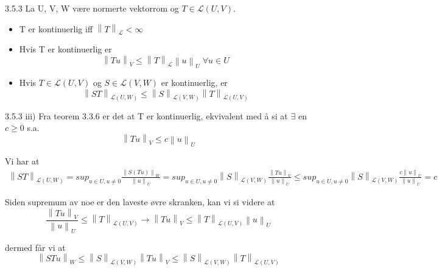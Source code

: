\documentclass[a4paper,norsk]{article}
\renewcommand{\geq}{\geqslant}
\renewcommand{\leq}{\leqslant}
\begin{document}
\begin{propositionbox}{3.5.3}{}
La U, V, W være normerte vektorrom og $ T \in \mathcal{L} \left( U, V \right)  $.
\begin{itemize}
    \item T er kontinuerlig iff $ \left\lVert T \right\rVert _{\mathcal{L} } < \infty $
    \item Hvis T er kontinuerlig er
    \[
        \left\lVert Tu \right\rVert _V \leq \left\lVert T \right\rVert _{\mathcal{L}} \left\lVert u \right\rVert _U \; \forall u \in U
    \]
    \item Hvis $ T \in \mathcal{L} \left( U, V \right)   $ og $ S \in \mathcal{L} \left( V, W \right)  $ er kontinuerlig, er
    \[
        \left\lVert ST \right\rVert _{\mathcal{L} \left( U, W \right) } \leq \left\lVert S \right\rVert _{\mathcal{L} \left( V, W \right) } \left\lVert T \right\rVert _{\mathcal{L} \left( U, V \right) }
    \]
    
\end{itemize}

\begin{proofbox}{3.5.3 iii)}{}
Fra teorem 3.3.6 er det at T er kontinuerlig, ekvivalent med å si at $ \exists $ en $ c \geq 0 $ s.a.
\[
    \left\lVert Tu \right\rVert_V \leq c \left\lVert u \right\rVert _U
\]

Vi har at
\begin{align*}
    \left\lVert ST \right\rVert _{\mathcal{L} \left( U, W \right) } = sup_{u \in U, u \neq 0} \frac{ \left\lVert S \left( Tu \right) \right\rVert_W  }{ \left\lVert u \right\rVert _U } = sup_{u \in U, u \neq 0} \left\lVert S \right\rVert _{\mathcal{L} \left( V, W \right) } \frac{ \left\lVert Tu \right\rVert _V }{ \left\lVert u \right\rVert_U  } \leq sup_{u \in U, u \neq 0} \left\lVert S \right\rVert _{\mathcal{L} \left( V, W \right)} \frac{ c \left\lVert u \right\rVert _U }{ \left\lVert u \right\rVert_U  } = c
\end{align*}

Siden supremum av noe er den laveste øvre skranken, kan vi si videre at 
\[
    \frac{ \left\lVert Tu \right\rVert _V }{ \left\lVert u \right\rVert_U  } \leq \left\lVert T \right\rVert _{\mathcal{L} \left( U, V \right) } \rightarrow \left\lVert Tu \right\rVert _V \leq \left\lVert T \right\rVert _{\mathcal{L} \left( U, V \right) } \left\lVert u \right\rVert _U
\]

dermed får vi at 
\[
    \left\lVert STu \right\rVert_W \leq \left\lVert S \right\rVert _{\mathcal{L} \left( V, W \right) } \left\lVert Tu \right\rVert _V \leq \left\lVert S \right\rVert _{\mathcal{L} \left( V, W \right)  } \left\lVert T \right\rVert _{\mathcal{L} \left( U, V \right) }
\]
\end{proofbox}
\end{propositionbox}
\end{document}
